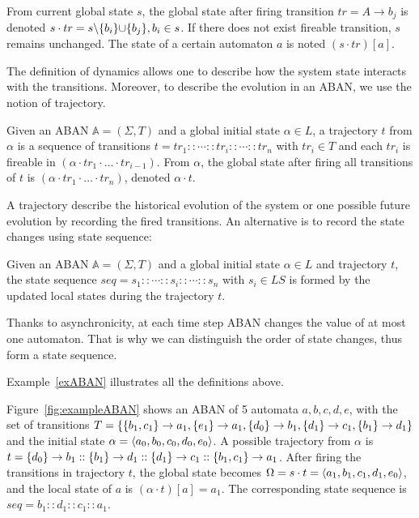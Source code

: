 \begin{definition}[Dynamics]\label{def:ABANdynamics}
    From current global state $s$, the global state after firing transition $tr=A\to b_j$ is denoted $s \cdot tr = s \miset{b_i} \addset {b_j}, b_i \in s$.
    If there does not exist fireable transition, $s$ remains unchanged.
    The state of a certain automaton $a$ is noted $(s\cdot tr)[a]$.
\end{definition}

The definition of dynamics allows one to describe how the system state interacts with the transitions. 
Moreover, to describe the evolution in an ABAN, we use the notion of trajectory.

\begin{definition}[Trajectory]
Given an ABAN $\mathbb{A} = (\Sigma,T)$ and a global initial state $\alpha\in L$, a trajectory $t$ from $\alpha$ is a sequence of transitions $t=tr_1::\cdots :: tr_i::\cdots ::tr_n$ with $tr_i\in T$ and each $tr_i$ is fireable in $(\alpha \cdot tr_1 \cdot \ldots \cdot tr_{i-1})$.
From $\alpha$, the global state after firing all transitions of $t$ is $(\alpha \cdot tr_1 \cdot \ldots \cdot tr_n)$, denoted $\alpha \cdot t$.
\end{definition}

A trajectory describe the historical evolution of the system or one possible future evolution by recording the fired transitions. 
An alternative is to record the state changes using state sequence:

\begin{definition}
Given an ABAN $\mathbb{A} = (\Sigma,T)$ and a global initial state $\alpha\in L$ and trajectory $t$, the state sequence $seq=s_1::\cdots :: s_i::\cdots ::s_n$ with $s_i\in LS$ is formed by the updated local states during the trajectory $t$.
\end{definition}

Thanks to asynchronicity, at each time step ABAN changes the value of at most one automaton.
That is why we can distinguish the order of state changes, thus form a state sequence.

Example~\ref{exABAN} illustrates all the definitions above.
\begin{example}\label{exABAN}
    Figure~\ref{fig:exampleABAN} shows an ABAN of 5 automata $a,b,c,d,e$, with the set of transitions $T=\{\acm{b_1,c_1}{a_0}{a_1},\acm{e_1}{a_0}{a_1},\acm{d_0}{b_0}{b_1},\acm{d_1}{c_0}{c_1},\acm{b_1}{d_0}{d_1}\}$ and the initial state $\alpha=\init{a_0,b_0,c_0,d_0,e_0}$.
    A possible trajectory from $\alpha$ is $t=\acm{d_0}{b_0}{b_1}::\acm{b_1}{d_0}{d_1}::\acm{d_1}{c_0}{c_1}::\acm{b_1,c_1}{a_0}{a_1}$.
    After firing the transitions in trajectory $t$, the global state becomes $\Omega=s\cdot t=\init{a_1,b_1,c_1,d_1,e_0}$, and the local state of $a$ is $(\alpha\cdot t)[a]=a_1$. 
    The corresponding state sequence is $seq=b_1::d_1::c_1::a_1$.
\end{example}


